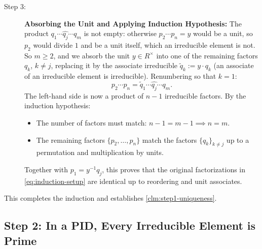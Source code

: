 \begin{proofWrapper}
\begin{content}
\begin{description}
    \item[Step 3:] \textbf{Absorbing the Unit and Applying Induction Hypothesis:} The product $q_1 \cdots \widehat{q_j} \cdots q_m$ is not empty: otherwise $p_2 \cdots p_n = y$ would be a unit, so $p_2$ would divide $1$ and be a unit itself, which an irreducible element is not. So $m \ge 2$, and we absorb the unit $y \in R^\times$ into one of the remaining factors $q_k$, $k \neq j$, replacing it by the associate irreducible $\tilde{q}_k := y \cdot q_k$ (an associate of an irreducible element is irreducible). Renumbering so that $k = 1$:
    \begin{equation}\label{eq:induction-reduced-chain}
    p_2 \cdots p_n = \tilde{q}_1 \cdots \widehat{q_j} \cdots q_m.
    \end{equation}
    The left-hand side is now a product of $n - 1$ irreducible factors. By the induction hypothesis:
    \begin{itemize}
        \item The number of factors must match: $n - 1 = m - 1 \implies n = m$.
        \item The remaining factors $\{p_2, \dots, p_n\}$ match the factors $\{q_k\}_{k \neq j}$ up to a permutation and multiplication by units.
    \end{itemize}
    Together with $p_1 = y^{-1} q_j$, this proves that the original factorizations in \eqref{eq:induction-setup} are identical up to reordering and unit associates.
\end{description}
This completes the induction and establishes \cref{clm:step1-uniqueness}.
\end{content}
\end{proofWrapper}

\subsection{Step 2: In a PID, Every Irreducible Element is Prime}

